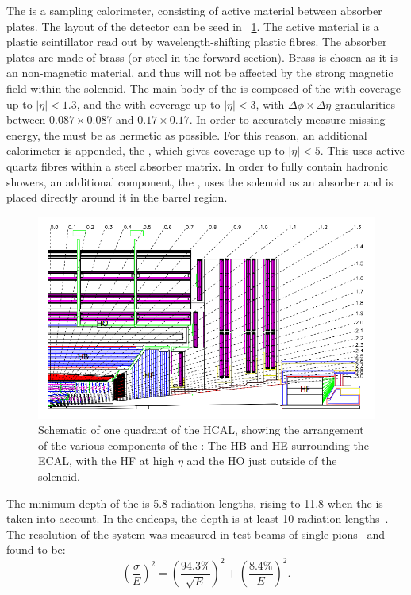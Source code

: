 The \CMS \HCAL is a sampling calorimeter, consisting of active material between absorber plates. The layout of the detector can be seed in \Fig~\ref{fig:hcal}. The active material is a plastic scintillator read out by wavelength-shifting plastic fibres. The absorber plates are made of brass (or steel in the forward section). Brass is chosen as it is an non-magnetic material, and thus will not be affected by the strong magnetic field within the solenoid. The main body of the \HCAL is composed of the \HB with coverage up to $|\eta| < 1.3$, and the \HE with coverage up to $|\eta| < 3$, with $\Delta\phi \times \Delta\eta$ granularities between $0.087 \times 0.087$ and $ 0.17 \times 0.17$. In order to accurately measure missing energy, the \HCAL must be as hermetic as possible. For this reason, an additional calorimeter is appended, the \HF, which gives coverage up to $|\eta| <5$. This uses active quartz fibres within a steel absorber matrix. In order to fully contain hadronic showers, an additional component, the \HO, uses the solenoid as an absorber and is placed directly around it in the barrel region.~\cite{cmsHcal} 

\begin{figure}[h]
\centering
\includegraphics[width=1.0\textwidth]{detectorFigures/cms_hcal.png}
\caption{Schematic \crosssection of one quadrant of the HCAL, showing the arrangement of the various components of the \subdetector: The HB and HE surrounding the ECAL, with the HF at high $\eta$ and the HO just outside of the solenoid\quad\cite{CMSatLHC}.}
\label{fig:hcal}
\end{figure}

The minimum depth of the \HB is 5.8 radiation lengths, rising to 11.8 when the \HO is taken into account. In the endcaps, the depth is at least 10 radiation lengths~\cite{cmsHcal}. The resolution of the \HCAL system was measured in test beams of single pions~\cite{Abdullin:2009zz} and found to be:
\begin{equation}
\label{eq:HCALresol}
\left( \frac{\sigma}{E}\right) ^2= \left( \frac{94.3\%}{\sqrt{E}} \right)^2 + \left( \frac{8.4\%}{E} \right)^2.
\end{equation}

